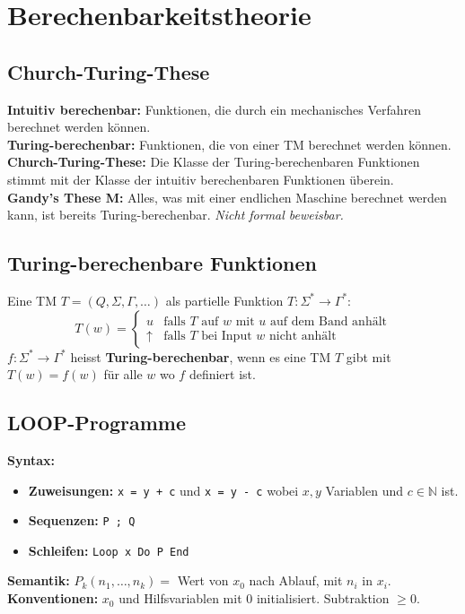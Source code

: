 \section{Berechenbarkeitstheorie}

\subsection{Church-Turing-These}
\textbf{Intuitiv berechenbar:} Funktionen, die durch ein mechanisches Verfahren berechnet werden können.\\
\textbf{Turing-berechenbar:} Funktionen, die von einer TM berechnet werden können.\\
\textbf{Church-Turing-These:} Die Klasse der Turing-berechenbaren Funktionen stimmt mit der Klasse der intuitiv berechenbaren Funktionen überein.\\
\textbf{Gandy's These M:} Alles, was mit einer endlichen Maschine berechnet werden kann, ist bereits Turing-berechenbar. 
\textit{Nicht formal beweisbar.}

\subsection{Turing-berechenbare Funktionen}
Eine TM $T = (Q, \Sigma, \Gamma, \ldots)$ als partielle Funktion $T : \Sigma^* \to \Gamma^*$:
\[
    T(w) = \begin{cases} u & \text{falls } T \text{ auf } w \text{ mit } u \text{ auf dem Band anhält} \\ \uparrow & \text{falls } T \text{ bei Input } w \text{ nicht anhält} \end{cases}
\]
$f : \Sigma^* \to \Gamma^*$ heisst \textbf{Turing-berechenbar}, wenn es eine TM $T$ gibt mit $T(w) = f(w)$ für alle $w$ wo $f$ definiert ist.\\

\subsection{LOOP-Programme}
\textbf{Syntax:}
\begin{itemize}
    \item \textbf{Zuweisungen:} \texttt{x = y + c} und \texttt{x = y - c} wobei $x, y$ Variablen und $c \in \mathbb{N}$ ist.
    \item \textbf{Sequenzen:} \texttt{P ; Q}
    \item \textbf{Schleifen:} \texttt{Loop x Do P End}
\end{itemize}
\textbf{Semantik:} $P_k(n_1, \ldots, n_k) =$ Wert von $x_0$ nach Ablauf, mit $n_i$ in $x_i$.\\
\textbf{Konventionen:} $x_0$ und Hilfsvariablen mit 0 initialisiert. Subtraktion $\geq 0$.

